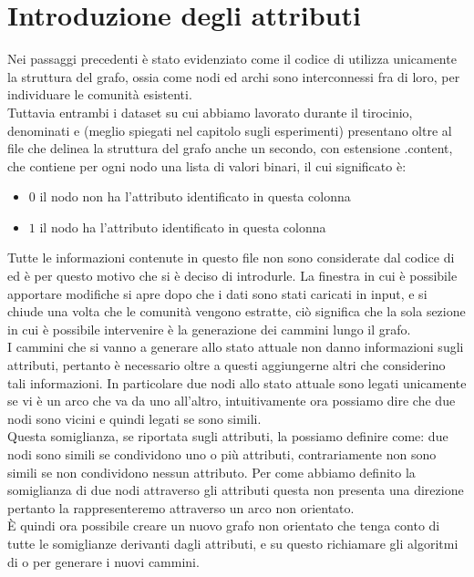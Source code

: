\section{Introduzione degli attributi}
Nei passaggi precedenti è stato evidenziato come il codice di \cnrl utilizza unicamente la struttura del grafo, ossia come nodi ed archi sono interconnessi fra di loro, per individuare le comunità esistenti.\\
Tuttavia entrambi i dataset su cui abbiamo lavorato durante il tirocinio, denominati \cora e \citeseer (meglio spiegati nel capitolo sugli esperimenti) presentano oltre al file che delinea la struttura del grafo anche un secondo, con estensione .content, che contiene per ogni nodo una lista di valori binari, il cui significato è:
\begin{itemize}
	\item $0$ il nodo non ha l'attributo identificato in questa colonna
	\item $1$ il nodo ha l'attributo identificato in questa colonna
\end{itemize}
%
Tutte le informazioni contenute in questo file non sono considerate dal codice di \cnrl ed è per questo motivo che si è deciso di introdurle. La finestra in cui è possibile apportare modifiche si apre dopo che i dati sono stati caricati in input, e si chiude una volta che le comunità vengono estratte, ciò significa che la sola sezione in cui è possibile intervenire è la generazione dei cammini lungo il grafo.\\
I cammini che si vanno a generare allo stato attuale non danno informazioni sugli attributi, pertanto è necessario oltre a questi aggiungerne altri che considerino tali informazioni. In particolare due nodi allo stato attuale sono legati unicamente se vi è un arco che va da uno 
all'altro, intuitivamente ora possiamo dire che due nodi sono vicini e quindi legati se sono simili.\\
Questa somiglianza, se riportata sugli attributi, la possiamo definire come: due nodi sono simili se condividono uno o più attributi, contrariamente non sono simili se non condividono nessun attributo. Per come abbiamo definito la somiglianza di due nodi attraverso gli attributi questa non presenta una direzione pertanto la rappresenteremo attraverso un arco non orientato.\\
È quindi ora possibile creare un nuovo grafo non orientato che tenga conto di tutte le somiglianze derivanti dagli attributi, e su questo richiamare gli algoritmi di \nv o \wv per generare i nuovi cammini.
%

